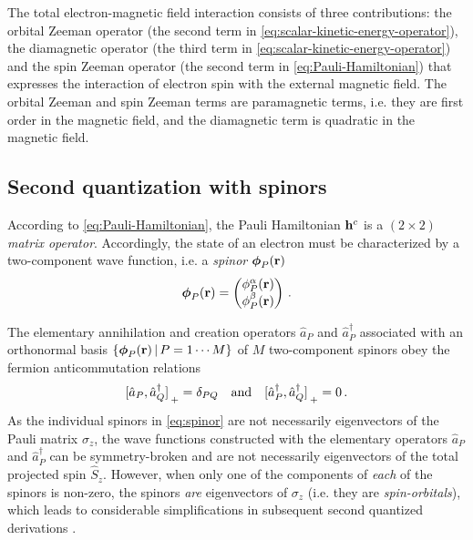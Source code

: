 \documentclass[journal=jctc,manuscript=article]{achemso}
\begin{document}
        The total electron-magnetic field interaction consists of three contributions: the orbital Zeeman operator (the second term in \cref{eq:scalar-kinetic-energy-operator}), the diamagnetic operator (the third term in \cref{eq:scalar-kinetic-energy-operator}) and the spin Zeeman operator (the second term in \cref{eq:Pauli-Hamiltonian}) that expresses the interaction of electron spin with the external magnetic field.
        The orbital Zeeman and spin Zeeman terms are paramagnetic terms, i.e. they are first order in the magnetic field, and the diamagnetic term is quadratic in the magnetic field.

    \subsection{Second quantization with spinors} \label{sec:theory:spinors}
        According to \cref{eq:Pauli-Hamiltonian}, the Pauli Hamiltonian $\vb{h}^c$ is a $(2 \times 2)$ \emph{matrix operator}.
        Accordingly, the state of an electron must be characterized by a two-component wave function, i.e. a \emph{spinor} $\boldsymbol{\phi}_P(\vb{r})$ \cite{Sen.2018, Sun.2019, Cohen-Tannoudji.2020.Volume2, Lemmens.2021}
        \begin{equation} \label{eq:spinor}
            \boldsymbol{\phi}_P(\vb{r})
            =
            \begin{pmatrix}
                \phi_P^\alpha(\vb{r}) \\
                \phi_P^\beta(\vb{r})
            \end{pmatrix}
            \thinspace .
        \end{equation}
        
        The elementary annihilation and creation operators $\hat{a}_P$ and $\hat{a}^\dagger_P$ associated with an orthonormal basis $\qty{ \boldsymbol{\phi}_P(\vb{r}) \thinspace | \thinspace P = 1 \cdots M }$ of $M$ two-component spinors obey the fermion anticommutation relations \cite{Surjan.1989, Helgaker.1991, Helgaker.2000, Helgaker.2012, Cohen-Tannoudji.2020.Volume3}
        \begin{equation}
            \comm*{ \hat{a}_P }{ \hat{a}^\dagger_Q }_+
            = \delta_{PQ}
            \qqtext{and}
            \comm*{ \hat{a}^\dagger_P }{ \hat{a}^\dagger_Q }_+
            = 0
            \thinspace .
        \end{equation}
        As the individual spinors in \cref{eq:spinor} are not necessarily eigenvectors of the Pauli matrix $\sigma_z$, the wave functions constructed with the elementary operators $\hat{a}_P$ and $\hat{a}^\dagger_P$ can be symmetry-broken and are not necessarily eigenvectors of the total projected spin $\hat{S}_z$.
        However, when only one of the components of \emph{each} of the spinors is non-zero, the spinors \emph{are} eigenvectors of $\sigma_z$ (i.e. they are \emph{spin-orbitals}), which leads to considerable simplifications in subsequent second quantized derivations \cite{Lemmens.2021}.
\end{document}
